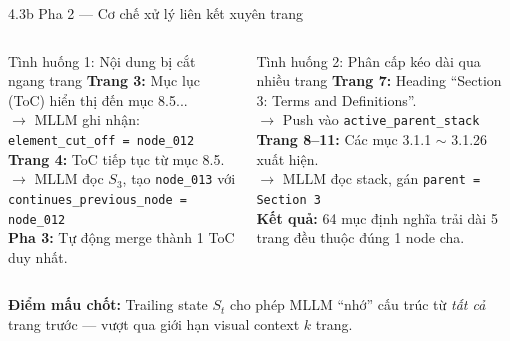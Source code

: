 \documentclass[aspectratio=1610,8pt]{beamer}
\begin{document}
\begin{frame}{4.3b \; Pha 2 — Cơ chế xử lý liên kết xuyên trang}
    \begin{columns}[T]
        \begin{exampleblock}{Tình huống 1: Nội dung bị cắt ngang trang}
            {\small
            \textbf{Trang 3:} Mục lục (ToC) hiển thị đến mục 8.5...\\
            $\rightarrow$ MLLM ghi nhận: \texttt{element\_cut\_off = node\_012}\\[0.4em]
            \textbf{Trang 4:} ToC tiếp tục từ mục 8.5.\\
            $\rightarrow$ MLLM đọc $S_3$, tạo \texttt{node\_013} với\\
            \quad \texttt{continues\_previous\_node = node\_012}\\[0.4em]
            \textbf{Pha 3:} Tự động merge thành 1 ToC duy nhất.
            }
        \end{exampleblock}

        \begin{exampleblock}{Tình huống 2: Phân cấp kéo dài qua nhiều trang}
            {\small
            \textbf{Trang 7:} Heading ``Section 3: Terms and Definitions''.\\
            $\rightarrow$ Push vào \texttt{active\_parent\_stack}\\[0.4em]
            \textbf{Trang 8--11:} Các mục 3.1.1 $\sim$ 3.1.26 xuất hiện.\\
            $\rightarrow$ MLLM đọc stack, gán \texttt{parent = Section 3}\\[0.4em]
            \textbf{Kết quả:} 64 mục định nghĩa trải dài 5 trang đều thuộc đúng 1 node cha.
            }
        \end{exampleblock}
    \end{columns}

    \vspace{0.5em}
    \begin{center}
        \textbf{Điểm mấu chốt:} Trailing state $S_t$ cho phép MLLM ``nhớ'' cấu trúc từ \textit{tất cả} trang trước — vượt qua giới hạn visual context $k$ trang.
    \end{center}
\end{frame}
\end{document}
